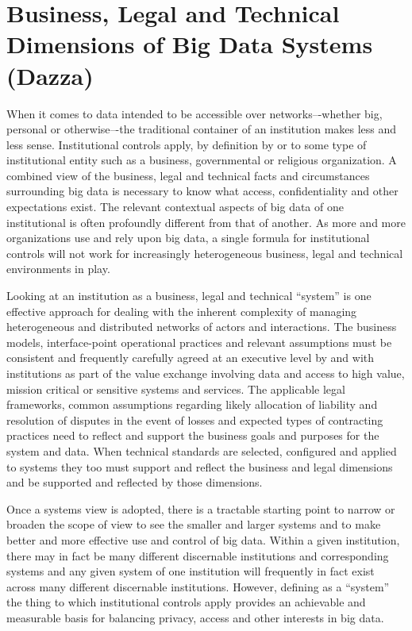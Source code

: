 \section{Business, Legal and Technical Dimensions of Big Data Systems (Dazza)}

When it comes to data intended to be accessible over networks–-whether big, personal or otherwise–-the traditional container of an institution makes less and less sense.
Institutional controls apply, by definition by or to some type of institutional entity such as a business, governmental or religious organization.
A combined view of the business, legal and technical facts and circumstances surrounding big data is necessary to know what access, confidentiality and other expectations exist.
The relevant contextual aspects of big data of one institutional is often profoundly different from that of another.
As more and more organizations use and rely upon big data, a single formula for institutional controls will not work for increasingly heterogeneous business, legal and technical environments in play.

Looking at an institution as a business, legal and technical “system” is one effective approach for dealing with the inherent complexity of managing heterogeneous and distributed networks of actors and interactions.
The business models, interface-point operational practices and relevant assumptions must be consistent and frequently carefully agreed at an executive level by and with institutions as part of the value exchange involving data and access to high value, mission critical or sensitive systems and services.
The applicable legal frameworks, common assumptions regarding likely allocation of liability and resolution of disputes in the event of losses and expected types of contracting practices need to reflect and support the business goals and purposes for the system and data.
When technical standards are selected, configured and applied to systems they too must support and reflect the business and legal dimensions and be supported and reflected by those dimensions.

Once a systems view is adopted, there is a tractable starting point to narrow or broaden the scope of view to see the smaller and larger systems and to make better and more effective use and control of big data.
Within a given institution, there may in fact be many different discernable institutions and corresponding systems and any given system of one institution will frequently in fact exist across many different discernable institutions. 
However, defining as a “system” the thing to which institutional controls apply provides an achievable and measurable basis for balancing privacy, access and other interests in big data.

